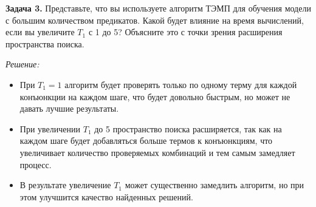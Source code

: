 \textbf{Задача 3.}
\newline
Представьте, что вы используете алгоритм ТЭМП для обучения модели с большим количеством предикатов. Какой будет влияние на время вычислений, если вы увеличите $T_1$ с 1 до 5? Объясните это с точки зрения расширения пространства поиска.

\textit{Решение:}
\begin{itemize}
    \item При $T_1 = 1$ алгоритм будет проверять только по одному терму для каждой конъюнкции на каждом шаге, что будет довольно быстрым, но может не давать лучшие результаты.
    \item При увеличении $T_1$ до 5 пространство поиска расширяется, так как на каждом шаге будет добавляться больше термов к конъюнкциям, что увеличивает количество проверяемых комбинаций и тем самым замедляет процесс.
    \item В результате увеличение $T_1$ может существенно замедлить алгоритм, но при этом улучшится качество найденных решений.
\end{itemize}
